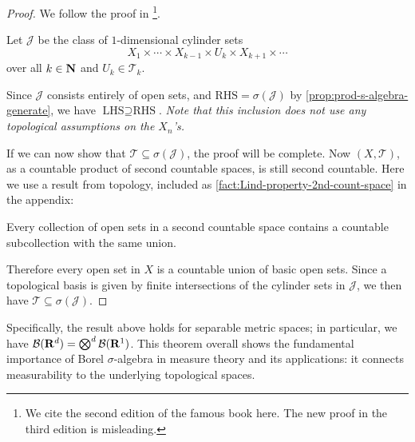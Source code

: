 \begin{proof}
    We follow the proof in \cite{Kallenberg_2002}\footnote{We cite the second edition of the famous book here. The new proof in the third edition is misleading.}.
    
    Let $\mathcal{J}$ be the class of $1$-dimensional cylinder sets \[
        X_1\times \dotsb \times X_{k-1} \times U_k \times X_{k+1} \times \dotsb
    \] over all $k \in \mathbf{N}$ and $U_k \in \mathcal{T}_k$.
    
    Since $\mathcal{J}$ consists entirely of open sets, and $\text{RHS} = \sigma(\mathcal{J})$ by \cref{prop:prod-s-algebra-generate}, we have $\text{LHS} \supseteq \text{RHS}$. \emph{Note that this inclusion does not use any topological assumptions on the $X_n$'s.}
    
    If we can now show that $\mathcal{T} \subseteq \sigma(\mathcal{J})$, the proof will be complete. Now $(X,\mathcal{T})$, as a countable product of second countable spaces, is still second countable. Here we use a result from topology, included as \cref{fact:Lind-property-2nd-count-space} in the appendix:
    
    \begin{center}
    \noindent\begin{minipage}[t]{0.9\columnwidth}
        Every collection of open sets in a second countable space contains a countable subcollection with the same union.
    \end{minipage}
    \end{center}
    
    Therefore every open set in $X$ is a countable union of basic open sets. Since a topological basis is given by finite intersections of the cylinder sets in $\mathcal{J}$, we then have $\mathcal{T} \subseteq \sigma(\mathcal{J})$.
\end{proof}

Specifically, the result above holds for separable metric spaces; in particular, we have $\mathcal{B}(\mathbf{R}^d) = \bigotimes^d \mathcal{B}(\mathbf{R}^1)$. This theorem overall shows the fundamental importance of Borel $\sigma$-algebra in measure theory and its applications: it connects measurability to the underlying topological spaces.

